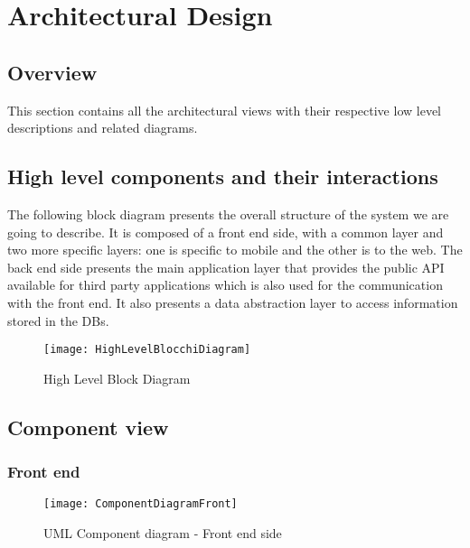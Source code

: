 \section{Architectural Design}

\subsection{Overview}
This section contains all the architectural views with their respective low level descriptions and related diagrams.

\subsection{High level components and their interactions}

The following block diagram presents the overall structure of the system we are going to describe.
It is composed of a front end side, with a common layer and two more specific layers: one is specific to mobile and the other is to the web.
The back end side presents the main application layer that provides the public API available for third party applications which is also used for the communication with the front end. It also presents a data abstraction layer to access information stored in the DBs.

\begin{figure}[]
        \centering
        \texttt{[image: HighLevelBlocchiDiagram]}
        \caption{High Level Block Diagram}
        \label{fig:blockDiagram}
\end{figure}
\newpage
\subsection{Component view}

\subsubsection{Front end}

\begin{figure}[h!]
        \centering
        \texttt{[image: ComponentDiagramFront]}
        \caption{UML Component diagram - Front end side}
        \label{fig:ComponentFront}
\end{figure}

